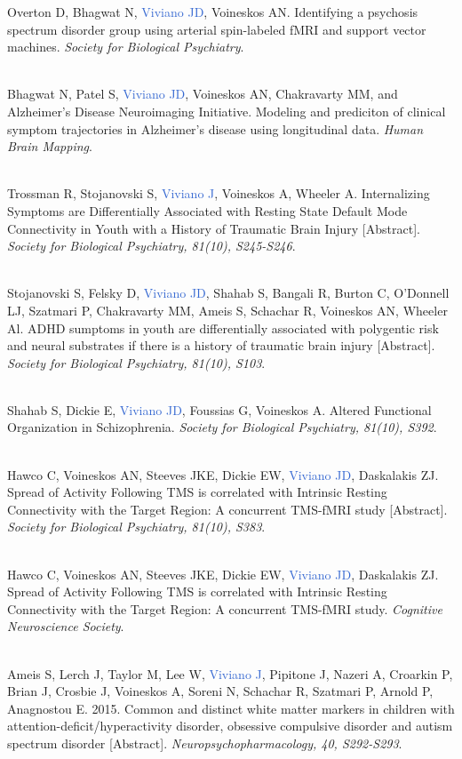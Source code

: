 \documentclass[a4paper,11pt,oneside]{book}
\begin{document}
\begin{flushleft}
Overton D, Bhagwat N, \textcolor{highlight}{Viviano JD}, Voineskos AN. Identifying a psychosis spectrum disorder group using arterial spin-labeled fMRI and support vector machines. \textit{Society for Biological Psychiatry}. \\\

Bhagwat N, Patel S, \textcolor{highlight}{Viviano JD}, Voineskos AN, Chakravarty MM, and Alzheimer's Disease Neuroimaging Initiative. Modeling and prediciton of clinical symptom trajectories in Alzheimer's disease using longitudinal data. \textit{Human Brain Mapping}. \\\

Trossman R, Stojanovski S, \textcolor{highlight}{Viviano J}, Voineskos A, Wheeler A. Internalizing Symptoms are Differentially Associated with Resting State Default Mode Connectivity in Youth with a History of Traumatic Brain Injury [Abstract]. \textit{Society for Biological Psychiatry, 81(10), S245-S246}. \\\

Stojanovski S, Felsky D, \textcolor{highlight}{Viviano JD}, Shahab S, Bangali R, Burton C, O'Donnell LJ, Szatmari P, Chakravarty MM, Ameis S, Schachar R, Voineskos AN, Wheeler Al. ADHD sumptoms in youth are differentially associated with polygentic risk and neural substrates if there is a history of traumatic brain injury [Abstract]. \textit{Society for Biological Psychiatry, 81(10), S103}. \\\

Shahab S, Dickie E, \textcolor{highlight}{Viviano JD}, Foussias G, Voineskos A. Altered Functional Organization in Schizophrenia. \textit{Society for Biological Psychiatry, 81(10), S392}. \\\

Hawco C, Voineskos AN, Steeves JKE, Dickie EW, \textcolor{highlight}{Viviano JD}, Daskalakis ZJ. Spread of Activity Following TMS is correlated with Intrinsic Resting Connectivity with the Target Region: A concurrent TMS-fMRI study [Abstract]. \textit{Society for Biological Psychiatry, 81(10), S383}. \\\

Hawco C, Voineskos AN, Steeves JKE, Dickie EW, \textcolor{highlight}{Viviano JD}, Daskalakis ZJ. Spread of Activity Following TMS is correlated with Intrinsic Resting Connectivity with the Target Region: A concurrent TMS-fMRI study. \textit{Cognitive Neuroscience Society}. \\\

Ameis S, Lerch J, Taylor M, Lee W, \textcolor{highlight}{Viviano J}, Pipitone J, Nazeri A, Croarkin P, Brian J, Crosbie J, Voineskos A, Soreni N, Schachar R, Szatmari P, Arnold P, Anagnostou E. 2015. Common and distinct white matter markers in children with attention-deficit/hyperactivity disorder, obsessive compulsive disorder and autism spectrum disorder [Abstract]. \textit{Neuropsychopharmacology, 40, S292-S293}. \\\


\end{flushleft}
\end{document}
